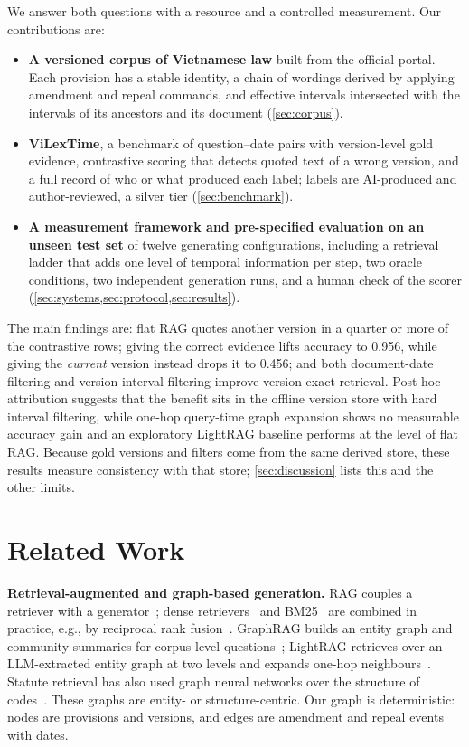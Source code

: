 \documentclass[conference]{IEEEtran}
\begin{document}
We answer both questions with a resource and a controlled measurement. Our contributions are:
\begin{itemize}
\item \textbf{A versioned corpus of Vietnamese law} built from the official portal. Each provision has a stable identity, a chain of wordings derived by applying amendment and repeal commands, and effective intervals intersected with the intervals of its ancestors and its document (\cref{sec:corpus}).
\item \textbf{ViLexTime}, a benchmark of question--date pairs with version-level gold evidence, contrastive scoring that detects quoted text of a wrong version, and a full record of who or what produced each label; labels are AI-produced and author-reviewed, a silver tier (\cref{sec:benchmark}).
\item \textbf{A measurement framework and pre-specified evaluation on an unseen test set} of twelve generating configurations, including a retrieval ladder that adds one level of temporal information per step, two oracle conditions, two independent generation runs, and a human check of the scorer (\cref{sec:systems,sec:protocol,sec:results}).
\end{itemize}
The main findings are: flat RAG quotes another version in a quarter or more of the contrastive rows; giving the correct evidence lifts accuracy to 0.956, while giving the \emph{current} version instead drops it to 0.456; and both document-date filtering and version-interval filtering improve version-exact retrieval. Post-hoc attribution suggests that the benefit sits in the offline version store with hard interval filtering, while one-hop query-time graph expansion shows no measurable accuracy gain and an exploratory LightRAG baseline performs at the level of flat RAG. Because gold versions and filters come from the same derived store, these results measure consistency with that store; \cref{sec:discussion} lists this and the other limits.

\section{Related Work}
\label{sec:related}

\textbf{Retrieval-augmented and graph-based generation.} RAG couples a retriever with a generator~\cite{lewis2020rag}; dense retrievers~\cite{karpukhin2020dpr} and BM25~\cite{robertson2009bm25} are combined in practice, e.g., by reciprocal rank fusion~\cite{cormack2009rrf}. GraphRAG builds an entity graph and community summaries for corpus-level questions~\cite{edge2024graphrag}; LightRAG retrieves over an LLM-extracted entity graph at two levels and expands one-hop neighbours~\cite{guo2025lightrag}. Statute retrieval has also used graph neural networks over the structure of codes~\cite{louis2023finding}. These graphs are entity- or structure-centric. Our graph is deterministic: nodes are provisions and versions, and edges are amendment and repeal events with dates.
\end{document}
